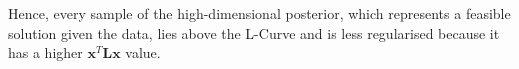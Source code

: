 Hence, every sample of the high-dimensional posterior, which represents a feasible solution given the data, lies above the L-Curve and is less regularised because it has a higher $ \bm{x}^T \bm{L} \bm{x}$ value.



